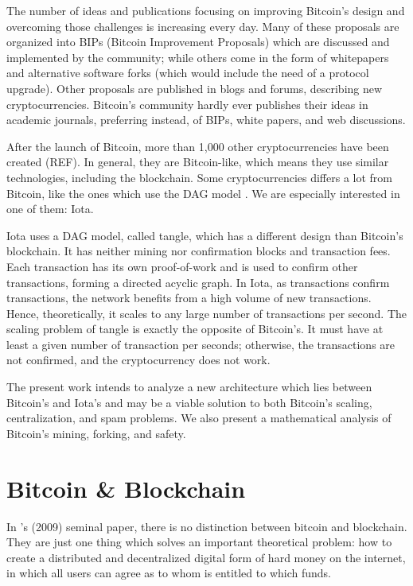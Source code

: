The number of ideas and publications focusing on improving Bitcoin's design and overcoming those challenges is increasing every day. Many of these proposals are organized into BIPs (Bitcoin Improvement Proposals) which are discussed and implemented by the community; while others come in the form of whitepapers and alternative software forks (which would include the need of a protocol upgrade). Other proposals are published in blogs and forums, describing new cryptocurrencies. Bitcoin's community hardly ever publishes their ideas in academic journals, preferring instead, of BIPs, white papers, and web discussions.

After the launch of Bitcoin, more than 1,000 other cryptocurrencies have been created (REF). In general, they are Bitcoin-like, which means they use similar technologies, including the blockchain. Some cryptocurrencies differs a lot from Bitcoin, like the ones which use the DAG model \citep{dagdiscussion2014, tangle2016, dagcoin2015, sompolinsky2013, lewenberg2015, vorick2015}. We are especially interested in one of them: Iota.

Iota uses a DAG model, called tangle, which has a different design than Bitcoin's blockchain. It has neither mining nor confirmation blocks and transaction fees. Each transaction has its own proof-of-work and is used to confirm other transactions, forming a directed acyclic graph. In Iota, as transactions confirm transactions, the network benefits from a high volume of new transactions. Hence, theoretically, it scales to any large number of transactions per second. The scaling problem of tangle is exactly the opposite of Bitcoin's. It must have at least a given number of transaction per seconds; otherwise, the transactions are not confirmed, and the cryptocurrency does not work.

The present work intends to analyze a new architecture which lies between Bitcoin's and Iota's and may be a viable solution to both Bitcoin's scaling, centralization, and spam problems. We also present a mathematical analysis of Bitcoin's mining, forking, and safety.


\chapter{Bitcoin \& Blockchain}

In \citeauthor{nakamoto2008bitcoin}'s (2009) seminal paper, there is no distinction between bitcoin and blockchain. They are just one thing which solves an important theoretical problem: how to create a distributed and decentralized digital form of hard money on the internet, in which all users can agree as to whom is entitled to which funds.

